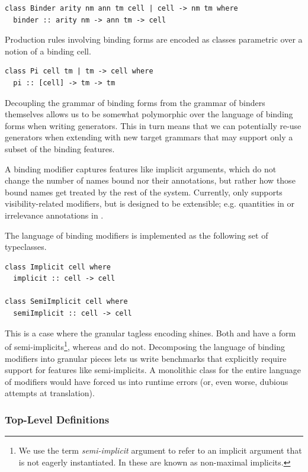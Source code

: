 \documentclass[a4paper,UKenglish,cleveref, autoref, thm-restate,anonymous]{lipics-v2021}
\begin{document}
\begin{lstlisting}[style=haskell,caption={The core \panbench binder class.}]
class Binder arity nm ann tm cell | cell -> nm tm where
  binder :: arity nm -> ann tm -> cell
\end{lstlisting}
Production rules involving binding forms are encoded as classes parametric
over a notion of a binding cell.
\begin{lstlisting}[style=haskell, caption={The \panbench class for \(\Pi\)-types.}]
class Pi cell tm | tm -> cell where
  pi :: [cell] -> tm -> tm
\end{lstlisting}

Decoupling the grammar of binding forms from the grammar of binders themselves allows us
to be somewhat polymorphic over the language of binding forms when writing generators.
This in turn means that we can potentially re-use generators when extending \panbench with
new target grammars that may support only a subset of the binding features.

A binding
modifier captures features like implicit arguments, which do not change the
number of names bound nor their annotations, but rather how those bound names
get treated by the rest of the system. Currently, \panbench only supports
visibility-related modifiers, but is designed to be extensible;
e.g. quantities in \idris or irrelevance annotations in \agda.

The language of binding modifiers is implemented as the following set of typeclasses.
\begin{lstlisting}[style=haskell,caption={Typeclasses for binding modifiers.}]
class Implicit cell where
  implicit :: cell -> cell

class SemiImplicit cell where
  semiImplicit :: cell -> cell
\end{lstlisting}

This is a case where the granular tagless encoding shines. Both \lean and \rocq
have a form of semi-implicits\footnote{We use the term \emph{semi-implicit}
argument to refer to an implicit argument that is not eagerly instantiated. In
\rocq these are known as non-maximal implicits.}, whereas \idris and \agda do not.
Decomposing the language of binding modifiers into granular
pieces lets us write benchmarks that explicitly require support for features
like semi-implicits.  A monolithic class for the entire
language of modifiers would have forced us into runtime errors
(or, even worse, dubious attempts at translation).

\subsubsection{Top-Level Definitions}
\label{sec:top-level}
\end{document}
